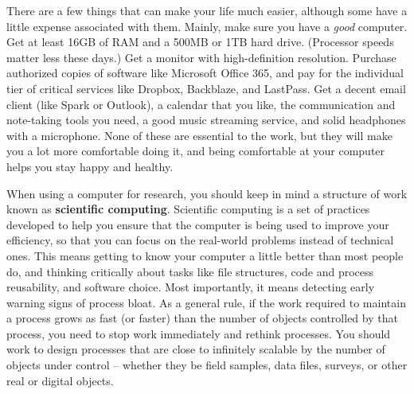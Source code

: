 There are a few things that can make your life much easier,
although some have a little expense associated with them.
Mainly, make sure you have a \textit{good} computer.
Get at least 16GB of RAM and a 500MB or 1TB hard drive.
(Processor speeds matter less these days.)
Get a monitor with high-definition resolution.
Purchase authorized copies of software like Microsoft Office 365,
and pay for the individual tier of critical services like Dropbox, Backblaze, and LastPass.
Get a decent email client (like Spark or Outlook),
a calendar that you like, the communication and note-taking tools you need,
a good music streaming service, and solid headphones with a microphone.
None of these are essential to the work,
but they will make you a lot more comfortable doing it,
and being comfortable at your computer helps you stay happy and healthy.

When using a computer for research,
you should keep in mind a structure of work
known as \textbf{scientific computing}.\cite{wilson2014best,wilson2017good}
Scientific computing is a set of practices developed to help you
ensure that the computer is being used to improve your efficiency,
so that you can focus on the real-world problems instead of technical ones.
This means getting to know your computer a little better than most people do,
and thinking critically about tasks like file structures,
code and process reusability,
and software choice. Most importantly,
it means detecting early warning signs of process bloat.
As a general rule, if the work required to maintain a process
grows as fast (or faster) than the number of objects controlled by that process,
you need to stop work immediately and rethink processes.
You should work to design processes that are
close to infinitely scalable by the number of objects under control --
whether they be field samples, data files, surveys, or other real or digital objects.

